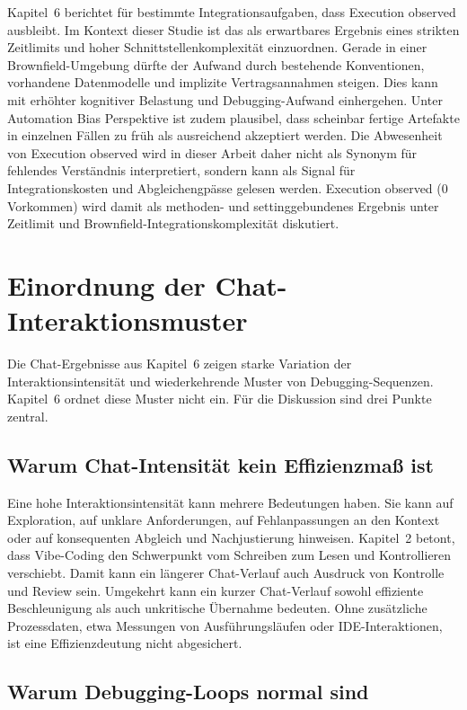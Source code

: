 Kapitel~6 berichtet f\"ur bestimmte Integrationsaufgaben, dass Execution observed ausbleibt.
Im Kontext dieser Studie ist das als erwartbares Ergebnis eines strikten Zeitlimits und hoher Schnittstellenkomplexit\"at einzuordnen.
Gerade in einer Brownfield-Umgebung d\"urfte der Aufwand durch bestehende Konventionen, vorhandene Datenmodelle und implizite Vertragsannahmen steigen.
Dies kann mit erh\"ohter kognitiver Belastung und Debugging-Aufwand einhergehen.
Unter Automation Bias Perspektive ist zudem plausibel, dass scheinbar fertige Artefakte in einzelnen F\"allen zu fr\"uh als ausreichend akzeptiert werden.
Die Abwesenheit von Execution observed wird in dieser Arbeit daher nicht als Synonym f\"ur fehlendes Verst\"andnis interpretiert, sondern kann als Signal f\"ur Integrationskosten und Abgleichengp\"asse gelesen werden.
Execution observed (0 Vorkommen) wird damit als methoden- und settinggebundenes Ergebnis unter Zeitlimit und Brownfield-Integrationskomplexit\"at diskutiert.

\section{Einordnung der Chat-Interaktionsmuster}
\label{sec:discussion_chat}

Die Chat-Ergebnisse aus Kapitel~6 zeigen starke Variation der Interaktionsintensit\"at und wiederkehrende Muster von Debugging-Sequenzen.
Kapitel~6 ordnet diese Muster nicht ein.
F\"ur die Diskussion sind drei Punkte zentral.

\subsection{Warum Chat-Intensit\"at kein Effizienzma\ss{} ist}
\label{sec:discussion_chat_intensity}

Eine hohe Interaktionsintensit\"at kann mehrere Bedeutungen haben.
Sie kann auf Exploration, auf unklare Anforderungen, auf Fehlanpassungen an den Kontext oder auf konsequenten Abgleich und Nachjustierung hinweisen.
Kapitel~2 betont, dass Vibe-Coding den Schwerpunkt vom Schreiben zum Lesen und Kontrollieren verschiebt.
Damit kann ein l\"angerer Chat-Verlauf auch Ausdruck von Kontrolle und Review sein.
Umgekehrt kann ein kurzer Chat-Verlauf sowohl effiziente Beschleunigung als auch unkritische \"Ubernahme bedeuten.
Ohne zus\"atzliche Prozessdaten, etwa Messungen von Ausf\"uhrungsl\"aufen oder IDE-Interaktionen, ist eine Effizienzdeutung nicht abgesichert.

\subsection{Warum Debugging-Loops normal sind}
\label{sec:discussion_debugging_loops}

